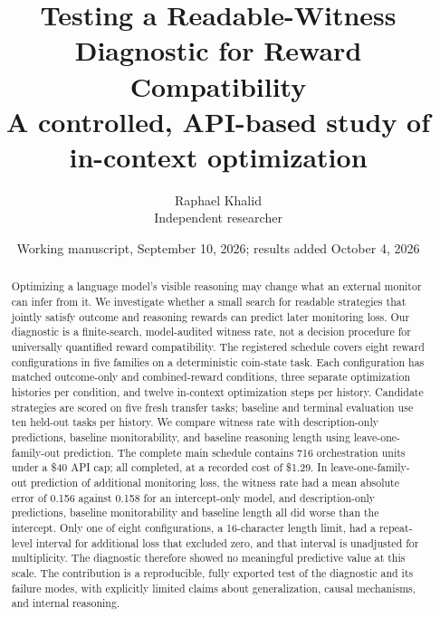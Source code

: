 \documentclass[11pt]{article}
\title{Testing a Readable-Witness Diagnostic for Reward Compatibility\\[4pt]\large A controlled, API-based study of in-context optimization}
\author{Raphael Khalid\\Independent researcher}
\date{Working manuscript, September 10, 2026; results added October 4, 2026}
\begin{document}
\maketitle
\begin{center}
\end{center}
\begin{abstract}
Optimizing a language model's visible reasoning may change what an external monitor can infer from it. We investigate whether a small search for readable strategies that jointly satisfy outcome and reasoning rewards can predict later monitoring loss. Our diagnostic is a finite-search, model-audited witness rate, not a decision procedure for universally quantified reward compatibility. The registered schedule covers eight reward configurations in five families on a deterministic coin-state task. Each configuration has matched outcome-only and combined-reward conditions, three separate optimization histories per condition, and twelve in-context optimization steps per history. Candidate strategies are scored on five fresh transfer tasks; baseline and terminal evaluation use ten held-out tasks per history. We compare witness rate with description-only predictions, baseline monitorability, and baseline reasoning length using leave-one-family-out prediction. The complete main schedule contains 716 orchestration units under a \$40 API cap; all completed, at a recorded cost of \$1.29. In leave-one-family-out prediction of additional monitoring loss, the witness rate had a mean absolute error of 0.156 against 0.158 for an intercept-only model, and description-only predictions, baseline monitorability and baseline length all did worse than the intercept. Only one of eight configurations, a 16-character length limit, had a repeat-level interval for additional loss that excluded zero, and that interval is unadjusted for multiplicity. The diagnostic therefore showed no meaningful predictive value at this scale. The contribution is a reproducible, fully exported test of the diagnostic and its failure modes, with explicitly limited claims about generalization, causal mechanisms, and internal reasoning.
\end{abstract}
\end{document}
